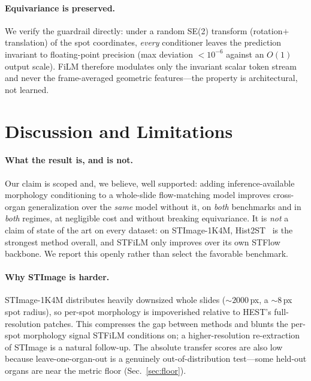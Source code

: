 \documentclass[10pt,twocolumn,letterpaper]{article}
\begin{document}
\paragraph{Equivariance is preserved.} We verify the guardrail directly: under a random SE(2)
transform (rotation${+}$translation) of the spot coordinates, \emph{every} conditioner leaves the
prediction invariant to floating-point precision (max deviation $<\!10^{-6}$ against an $O(1)$
output scale). FiLM therefore modulates only the invariant scalar token stream and never the
frame-averaged geometric features---the property is architectural, not learned.

\section{Discussion and Limitations}
\label{sec:discussion}
\paragraph{What the result is, and is not.} Our claim is scoped and, we believe, well supported:
adding inference-available morphology conditioning to a whole-slide flow-matching model improves
cross-organ generalization over the \emph{same} model without it, on \emph{both} benchmarks and in
\emph{both} regimes, at negligible cost and without breaking equivariance. It is \emph{not} a claim
of state of the art on every dataset: on STImage-1K4M, Hist2ST~\cite{hist2st} is the strongest
method overall, and STFiLM only improves over its own STFlow backbone. We report this openly rather
than select the favorable benchmark.
\paragraph{Why STImage is harder.} STImage-1K4M distributes heavily downsized whole slides
(${\sim}2000$\,px, a ${\sim}8$\,px spot radius), so per-spot morphology is impoverished relative to
HEST's full-resolution patches. This compresses the gap between methods and blunts the per-spot
morphology signal STFiLM conditions on; a higher-resolution re-extraction of STImage is a natural
follow-up. The absolute transfer scores are
also low because leave-one-organ-out is a genuinely out-of-distribution test---some held-out organs
are near the metric floor (Sec.~\ref{sec:floor}).
\end{document}
